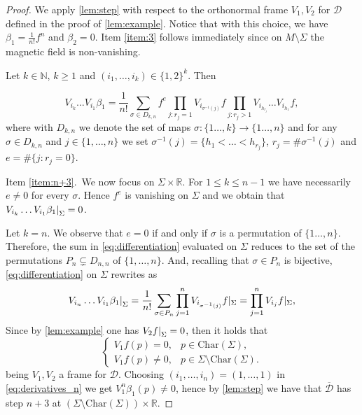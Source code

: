 \documentclass{amsart}
\theoremstyle{plain}
\theoremstyle{definition}
\theoremstyle{remark}
\newcommand{\R}{\mathbb{R}}
\newcommand{\distr}{\mathcal{D}}								%
\newcommand{\B}{\beta}
\newcommand{\lift}[1]{\overline{#1}} 							%
\newcommand\restr[2]{{													%
  \left.\kern-\nulldelimiterspace 					
  #1 																			
  \right|_{#2} 														
  }}
\begin{document}
\begin{proof}
We apply \cref{lem:step} with respect to the orthonormal frame $V_1,V_2$ for $\distr$ defined in the proof of \cref{lem:example}.
Notice that with this choice, we have $\B_1=\frac{1}{n!}f^{n}$ and $\B_2=0$. 
Item \ref{item:3} follows immediately since on $M \setminus \Sigma$ the magnetic field is non-vanishing. 


Let $k\in \mathbb{N}$, $k\geq 1$ %
and  $({i_1},\ldots,{i_k})\in\{1,2\}^k$. Then

\begin{equation}
\label{eq:differentiation}
V_{i_k}\ldots V_{i_1}\B_1 
	= \frac{1}{n!}
\sum_	{\sigma\in D_{k,n}}		%
	f^{e}
\prod_{j \colon r_{j}=1}
	V_{i_{\sigma^{-1}(j)}}f
\prod_{j \colon r_{j}>1}		
	V_{i_{h_{r_{j}}}}\ldots V_{i_{h_1}}f,
\end{equation}
where with
$D_{k,n}$ we denote the set of maps $\sigma:\{1\ldots,k\}\to \{1\ldots,n\}$
and for any $\sigma\in D_{k,n}$ and  $j\in \{1,\ldots,n\}$ we set $\sigma^{-1}(j)=\{h_1<\ldots<h_{r_{j}}\}$,  
	$r_{j}=\#\sigma^{-1}(j)$
	and $e=\#\{j\colon r_{j}=0\}$.

Item \ref{item:n+3}.\
We now focus on $\Sigma\times \R$.
For $ 1\leq k\leq n-1$ we have necessarily  $e\neq 0$ for every $\sigma$. 
Hence $f^e$ is vanishing on $\Sigma$ and we obtain that $\restr{V_{i_k}\ldots V_{i_1}\B_1}{\Sigma}=0$.

Let $k=n$.  We observe that $e=0$ if and only if $\sigma$ is a permutation of $\{1\ldots,n\}$. 
Therefore,  the sum in \eqref{eq:differentiation} evaluated on $\Sigma$ reduces to  the set of the permutations $P_{n}\subsetneq D_{n,n}$ of $\{1,\ldots, n\}$. 
And, recalling that $\sigma\in P_{n}$ is bijective, \eqref{eq:differentiation} on $\Sigma$ rewrites as
\begin{equation}
\label{eq:derivatives_n}
\restr{V_{i_n}\ldots V_{i_1}\B_1}{\Sigma}
=\frac{1}{n!}\sum_{\sigma\in P_{n}}
	\prod_{j =1}^n
		{V_{i_{\sigma^{-1}(j)}}f}|_{\Sigma}
=\prod_{j=1}^n{V_{i_j}f}|_{\Sigma},
\end{equation} 
Since by \cref{lem:example} one has $\restr{V_2f}{\Sigma}=0$, then it holds that 
\begin{equation}
\begin{cases}
V_1f(p)=0, & p\in \mathrm{Char}(\Sigma),\\
V_1f(p)\neq0, & p\in \Sigma\setminus \mathrm{Char}(\Sigma).
\end{cases}
\end{equation}
being $V_1,V_2$ a frame for $\distr$.
 Choosing $({i_1},\ldots,{i_n})=(1,\ldots,1)$ in \eqref{eq:derivatives_n} we get $V_1^n\B_1(p)\neq 0$, hence by \cref{lem:step} we have that $\lift\distr$ has step $n+3$ at $(\Sigma\setminus \mathrm{Char}(\Sigma))\times \R$.


\end{proof}
\end{document}
